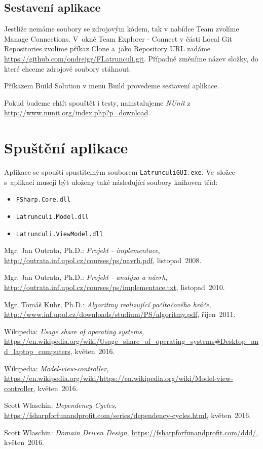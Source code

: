 \documentclass[12pt]{article}
\begin{document}
\subsection{Sestavení aplikace}
Jestliže nemáme soubory se zdrojovým kódem, tak v nabídce Team zvolíme Manage Connections. V~okně Team Explorer - Connect v části Local Git Repositories zvolíme příkaz Clone a~jako Repository URL zadáme \url{https://github.com/ondrejgr/FLatrunculi.git}. Případně změníme název složky, do které chceme zdrojové soubory stáhnout.

Příkazem Build Solution v menu Build provedeme sestavení aplikace.

Pokud budeme chtít spouštět i testy, nainstalujeme \emph{NUnit} z \url{http://www.nunit.org/index.php?p=download}.

\section{Spuštění aplikace}
Aplikace se spouští spustitelným souborem \texttt{LatrunculiGUI.exe}. Ve~složce s~aplikací musejí být uloženy také následující soubory knihoven tříd:
	\begin{itemize}  
		\item \texttt{FSharp.Core.dll}
		\item \texttt{Latrunculi.Model.dll}
		\item \texttt{Latrunculi.ViewModel.dll}
	\end{itemize}

\newpage
\begin{thebibliography}{10}
	
 Mgr. Jan Outrata, Ph.D.: \emph{Projekt - implementace},
 \url{http://outrata.inf.upol.cz/courses/ps/navrh.pdf},
			listopad~2008.

	
 Mgr. Jan Outrata, Ph.D.: \emph{Projekt - analýza a návrh},
 \url{http://outrata.inf.upol.cz/courses/ps/implementace.txt},
			listopad~2010.

 Mgr. Tomáš Kühr, Ph.D.: \emph{Algoritmy realizující počítačového hráče},
 \url{http://www.inf.upol.cz/downloads/studium/PS/algoritmy.pdf},
			říjen~2011.

Wikipedia: \emph{Usage share of operating systems},
 \url{https://en.wikipedia.org/wiki/Usage_share_of_operating_systems#Desktop_and_laptop_computers},
			květen~2016.

Wikipedia: \emph{Model-view-controller},
 \url{https://en.wikipedia.org/wiki/https://en.wikipedia.org/wiki/Model-view-controller},
			květen~2016.


Scott Wlaschin: \emph{Dependency Cycles},
 \url{https://fsharpforfunandprofit.com/series/dependency-cycles.html},
			květen~2016.

Scott Wlaschin: \emph{Domain Driven Design},
 \url{https://fsharpforfunandprofit.com/ddd/},
			květen~2016.

\end{thebibliography} 
\end{document}
